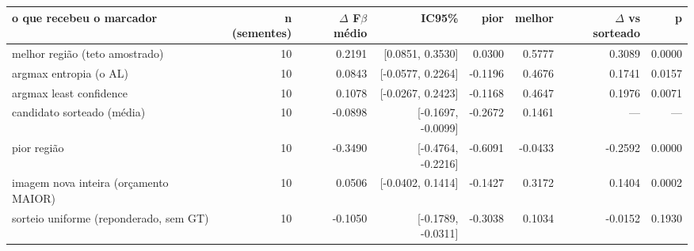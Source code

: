 \begin{tabular}{lrrrrrrr}
\hline
o que recebeu o marcador & n (sementes) & $\Delta$ F$\beta$ médio & IC95\% & pior & melhor & $\Delta$ vs sorteado & p \\
\hline
melhor região (teto amostrado) & 10 & 0.2191 & [0.0851, 0.3530] & 0.0300 & 0.5777 & 0.3089 & 0.0000 \\
argmax entropia (o AL) & 10 & 0.0843 & [-0.0577, 0.2264] & -0.1196 & 0.4676 & 0.1741 & 0.0157 \\
argmax least confidence & 10 & 0.1078 & [-0.0267, 0.2423] & -0.1168 & 0.4647 & 0.1976 & 0.0071 \\
candidato sorteado (média) & 10 & -0.0898 & [-0.1697, -0.0099] & -0.2672 & 0.1461 & --- & --- \\
pior região & 10 & -0.3490 & [-0.4764, -0.2216] & -0.6091 & -0.0433 & -0.2592 & 0.0000 \\
imagem nova inteira (orçamento MAIOR) & 10 & 0.0506 & [-0.0402, 0.1414] & -0.1427 & 0.3172 & 0.1404 & 0.0002 \\
sorteio uniforme (reponderado, sem GT) & 10 & -0.1050 & [-0.1789, -0.0311] & -0.3038 & 0.1034 & -0.0152 & 0.1930 \\
\hline
\end{tabular}
